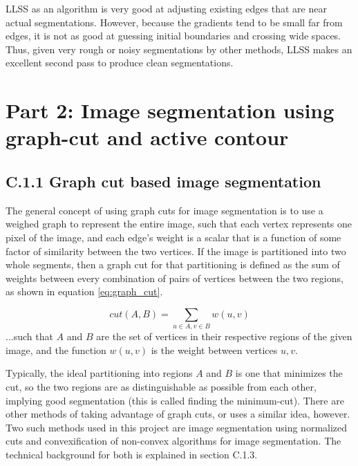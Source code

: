 \documentclass{article}
\begin{document}
LLSS as an algorithm is very good at adjusting existing edges that are near actual segmentations. However, because the gradients tend to be small far from edges, it is not as good at guessing initial boundaries and crossing wide spaces\cite{osher}. Thus, given very rough or noisy segmentations by other methods, LLSS makes an excellent second pass to produce clean segmentations.












\clearpage
\section*{Part 2: Image segmentation using graph-cut and active contour}

\subsection*{C.1.1 Graph cut based image segmentation}

The general concept of using graph cuts for image segmentation is to use a weighed graph to represent the entire image, such that each vertex represents one pixel of the image, and each edge's weight is a scalar that is a function of some factor of similarity between the two vertices. If the image is partitioned into two whole segments, then a graph cut for that partitioning is defined as the sum of weights between every combination of pairs of vertices between the two regions, as shown in equation \ref{eq:graph_cut}.

\begin{equation}
cut(A,B) = \sum_{u\in A,v\in B} w(u,v)
\label{eq:graph_cut}
\end{equation}
...such that $A$ and $B$ are the set of vertices in their respective regions of the given image, and the function $w(u,v)$ is the weight between vertices $u,v$.

Typically, the ideal partitioning into regions $A$ and $B$ is one that minimizes the cut, so the two regions are as distinguishable as possible from each other, implying good segmentation (this is called finding the minimum-cut). There are other methods of taking advantage of graph cuts, or uses a similar idea, however. Two such methods used in this project are image segmentation using normalized cuts and convexification of non-convex algorithms for image segmentation. The technical background for both is explained in section C.1.3.
\end{document}
